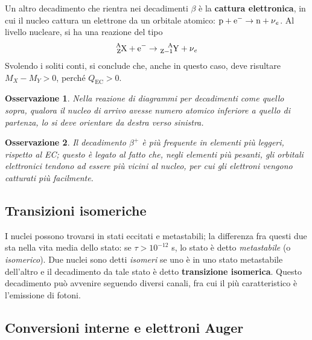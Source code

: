 \documentclass[11pt, a4paper]{scrartcl}
\theoremstyle{style}
\newtheorem{osservazione}{Osservazione}[section]
\theoremstyle{style1}
\numberwithin{equation}{subsection}
\begin{document}
Un altro decadimento che rientra nei decadimenti $\beta $ \`e la \textbf{cattura elettronica}, in cui il nucleo cattura un elettrone da un orbitale atomico: $\ce{p + e-} \to \ce{n + \nu _e}$.
Al livello nucleare, si ha una reazione del tipo
\begin{equation}
	\ce{^A_ZX + e-} \to \ce{^A_{Z-1}Y + \nu _e}
\end{equation}
Svolendo i soliti conti, si conclude che, anche in questo caso, deve risultare $M_X - M_Y > 0$, perch\'e $Q_\text{EC} > 0$.
\begin{osservazione}
Nella reazione di diagrammi per decadimenti come quello sopra, qualora il nucleo di arrivo avesse numero atomico inferiore a quello di partenza, lo si deve orientare da destra verso sinistra.
\end{osservazione}
\begin{osservazione}
Il decadimento $\beta ^+$ \`e pi\`u frequente in elementi pi\`u leggeri, rispetto al EC; questo \`e legato al fatto che, negli elementi pi\`u pesanti, gli orbitali elettronici tendono ad essere pi\`u vicini al nucleo, per cui gli elettroni vengono catturati pi\`u facilmente.
\end{osservazione}
\subsection{Transizioni isomeriche}
I nuclei possono trovarsi in stati eccitati e metastabili; la differenza fra questi due sta nella vita media dello stato: se $\tau  > 10 ^{-12}$ s, lo stato \`e detto \textit{metastabile} (o \textit{isomerico}).
Due nuclei sono detti \textit{isomeri} se uno \`e in uno stato metastabile dell'altro e il decadimento da tale stato \`e detto \textbf{transizione isomerica}.
Questo decadimento pu\`o avvenire seguendo diversi canali, fra cui il pi\`u caratteristico \`e l'emissione di fotoni.

\subsection{Conversioni interne e elettroni Auger}
\end{document}
